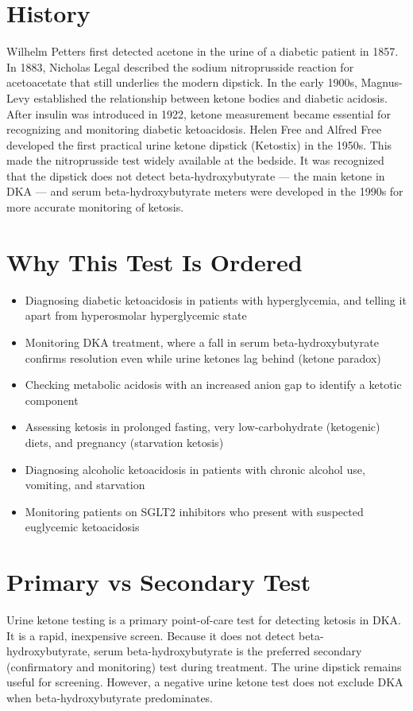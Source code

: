 \section*{History}
Wilhelm Petters first detected acetone in the urine of a diabetic patient in 1857. In 1883, Nicholas Legal described the sodium nitroprusside reaction for acetoacetate that still underlies the modern dipstick. In the early 1900s, Magnus-Levy established the relationship between ketone bodies and diabetic acidosis. After insulin was introduced in 1922, ketone measurement became essential for recognizing and monitoring diabetic ketoacidosis. Helen Free and Alfred Free developed the first practical urine ketone dipstick (Ketostix) in the 1950s. This made the nitroprusside test widely available at the bedside. It was recognized that the dipstick does not detect beta-hydroxybutyrate --- the main ketone in DKA --- and serum beta-hydroxybutyrate meters were developed in the 1990s for more accurate monitoring of ketosis.
\section*{Why This Test Is Ordered}
\begin{itemize}
  \item Diagnosing diabetic ketoacidosis in patients with hyperglycemia, and telling it apart from hyperosmolar hyperglycemic state \cite{kitabchi2001management}
  \item Monitoring DKA treatment, where a fall in serum beta-hydroxybutyrate confirms resolution even while urine ketones lag behind (ketone paradox) \cite{kitabchi2009hyperglycemic}
  \item Checking metabolic acidosis with an increased anion gap to identify a ketotic component
  \item Assessing ketosis in prolonged fasting, very low-carbohydrate (ketogenic) diets, and pregnancy (starvation ketosis)
  \item Diagnosing alcoholic ketoacidosis in patients with chronic alcohol use, vomiting, and starvation
  \item Monitoring patients on SGLT2 inhibitors who present with suspected euglycemic ketoacidosis
\end{itemize}
\section*{Primary vs Secondary Test}
Urine ketone testing is a primary point-of-care test for detecting ketosis in DKA. It is a rapid, inexpensive screen. Because it does not detect beta-hydroxybutyrate, serum beta-hydroxybutyrate is the preferred secondary (confirmatory and monitoring) test during treatment. The urine dipstick remains useful for screening. However, a negative urine ketone test does not exclude DKA when beta-hydroxybutyrate predominates.
